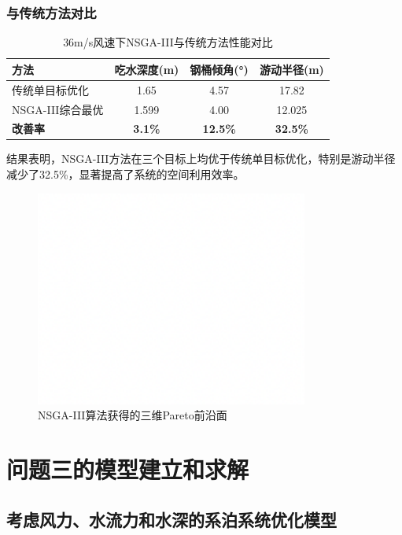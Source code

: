 \documentclass[withoutpreface,bwprint]{cumcmthesis}
\begin{document}
\subsubsection{与传统方法对比}
\begin{table}[H]
\centering
\begin{tabular}{lccc}
\toprule
方法 & 吃水深度(m) & 钢桶倾角(°) & 游动半径(m) \\
\midrule
传统单目标优化 & 1.65 & 4.57 & 17.82 \\
NSGA-III综合最优 & 1.599 & 4.00 & 12.025 \\
\textbf{改善率} & \textbf{3.1\%} & \textbf{12.5\%} & \textbf{32.5\%} \\
\bottomrule
\end{tabular}
\caption{36m/s风速下NSGA-III与传统方法性能对比}
\label{tab:方法对比}
\end{table}

结果表明，NSGA-III方法在三个目标上均优于传统单目标优化，特别是游动半径减少了32.5\%，显著提高了系统的空间利用效率。

\begin{figure}[H]
\centering
\includegraphics[width=0.8\textwidth]{figures/测试图片.png}
\caption{NSGA-III算法获得的三维Pareto前沿面}
\label{fig:pareto_front_3d}
\end{figure}

\section{问题三的模型建立和求解}
\subsection{考虑风力、水流力和水深的系泊系统优化模型}
\end{document}
